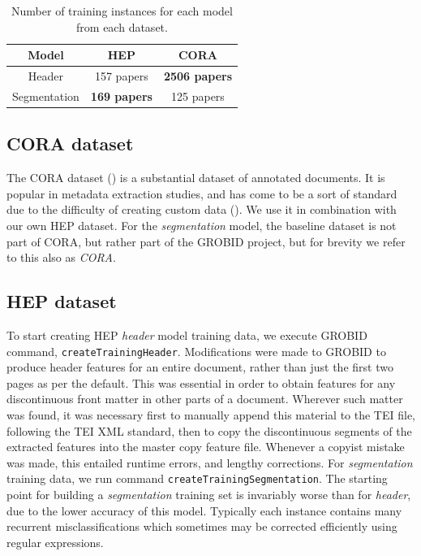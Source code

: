 \begin{table}[h]
\begin{center}
\begin{tabular}{|c|c|c|}
\hline
Model & HEP & CORA \\
\hline
Header & 157 papers & \textbf{2506 papers} \\
\hline
Segmentation & \textbf{169 papers} & 125 papers \\
\hline
\end{tabular}
\caption[Number of training instances for each model from each dataset.]{Number of training instances for each model from each dataset.}
\label{table:headervssegmentation}
\end{center}
\end{table}

\subsection{CORA dataset}
\label{subsec:cora}
The CORA dataset (\cite{mccallum2000automating}) is a substantial dataset of annotated documents. It is popular in metadata extraction studies, and has come to be a sort of standard due to the difficulty of creating custom data (\cite{Peng04accurateinformation}). We use it in combination with our own HEP dataset. For the \emph{segmentation} model, the baseline dataset is not part of CORA, but rather part of the GROBID project, but for brevity we refer to this also as \emph{CORA}.

\subsection{HEP dataset}
\label{subsec:hepdatasetheader}

To start creating HEP \emph{header} model training data, we execute GROBID command, \texttt{createTrainingHeader}. Modifications were made to GROBID to produce header features for an entire document, rather than just the first two pages as per the default. This was essential in order to obtain features for any discontinuous front matter in other parts of a document. Wherever such matter was found, it was necessary first to manually append this material to the TEI file, following the TEI XML standard, then to copy the discontinuous segments of the extracted features into the master copy feature file. Whenever a copyist mistake was made, this entailed runtime errors, and lengthy corrections. For \emph{segmentation} training data, we run command \texttt{createTrainingSegmentation}. The starting point for building a \emph{segmentation} training set is invariably worse than for \emph{header}, due to the lower accuracy of this model. Typically each instance contains many recurrent misclassifications which sometimes may be corrected efficiently using regular expressions.

